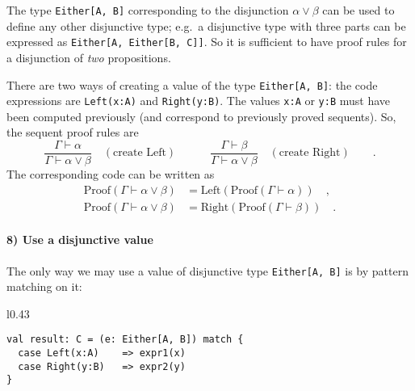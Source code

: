 The type \lstinline!Either[A, B]! corresponding to the disjunction
$\alpha\vee\beta$ can be used to define any other disjunctive type;
e.g.~a disjunctive type with three parts can be expressed as \lstinline!Either[A, Either[B, C]]!.
So it is sufficient to have proof rules for a disjunction of \emph{two}
propositions.

There are two ways of creating a value of the type \lstinline!Either[A, B]!:
the code expressions are \lstinline!Left(x:A)! and \lstinline!Right(y:B)!.
The values \lstinline!x:A! or \lstinline!y:B! must have been computed
previously (and correspond to previously proved sequents). So, the
sequent proof rules are
\[
\frac{\Gamma\vdash\alpha}{\Gamma\vdash\alpha\vee\beta}\quad(\text{create Left})\quad\quad\quad\frac{\Gamma\vdash\beta}{\Gamma\vdash\alpha\vee\beta}\quad(\text{create Right})\quad\quad.
\]
The corresponding code can be written as 
\begin{align*}
\text{Proof}\left(\Gamma\vdash\alpha\vee\beta\right) & =\text{Left}(\text{Proof}\left(\Gamma\vdash\alpha\right))\quad,\\
\text{Proof}\left(\Gamma\vdash\alpha\vee\beta\right) & =\text{Right}(\text{Proof}\left(\Gamma\vdash\beta\right))\quad.
\end{align*}


\paragraph{8) Use a disjunctive value}

The only way we may use a value of disjunctive type \lstinline!Either[A, B]!
is by pattern matching on it:

\begin{wrapfigure}{l}{0.43\columnwidth}%
\vspace{-0.6\baselineskip}
\begin{lstlisting}
val result: C = (e: Either[A, B]) match {
  case Left(x:A)    => expr1(x)
  case Right(y:B)   => expr2(y)
}
\end{lstlisting}

\vspace{-0.9\baselineskip}
\end{wrapfigure}%

